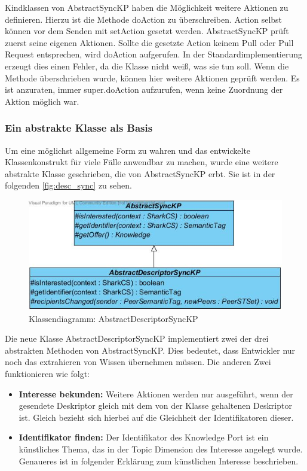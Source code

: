 \documentclass[a4paper]{article}
\begin{document}
	Kindklassen von AbstractSyncKP haben die Möglichkeit weitere Aktionen zu
	definieren. Hierzu ist die Methode doAction zu überschreiben. Action selbst
	können vor dem Senden mit setAction gesetzt werden. AbstractSyncKP prüft
	zuerst seine eigenen Aktionen. Sollte die gesetzte Action keinem Pull
	oder Pull Request entsprechen, wird doAction aufgerufen.
	In der Standardimplementierung
	erzeugt dies einen Fehler, da die Klasse nicht weiß, was sie tun soll.
	Wenn die Methode überschrieben wurde, können hier weitere Aktionen
	geprüft werden. Es ist anzuraten, immer super.doAction aufzurufen, wenn keine 
	Zuordnung der Aktion möglich war.
		
	\subsubsection{Ein abstrakte Klasse als Basis}
	
	Um eine möglichst allgemeine Form zu wahren und das entwickelte Klassenkonstrukt
	für viele Fälle anwendbar zu machen, wurde eine weitere abstrakte Klasse
	geschrieben, die von AbstractSyncKP erbt. Sie ist in der folgenden
	\autoref{fig:desc_sync} zu sehen.
	
	\begin{figure}[H]
		\includegraphics[width=\linewidth]{../Bilder/desc_sync.jpg}
		\caption{Klassendiagramm: AbstractDescriptorSyncKP}
		\label{fig:desc_sync}
	\end{figure}	
	
	Die neue Klasse AbstractDescriptorSyncKP implementiert zwei der drei
	abstrakten Methoden von AbstractSyncKP. Dies bedeutet, dass Entwickler
	nur noch das extrahieren von Wissen übernehmen müssen. Die anderen
	Zwei funktionieren wie folgt:
	
	\begin{itemize}
		\item \textbf{Interesse bekunden:} Weitere Aktionen werden nur ausgeführt,
		wenn der gesendete Deskriptor gleich mit dem von der Klasse gehaltenen
		Deskriptor ist. Gleich bezieht sich hierbei auf die Gleichheit der
		Identifikatoren dieser.
		\item \textbf{Identifikator finden:} Der Identifikator des Knowledge
		Port ist ein künstliches Thema, das in der Topic Dimension des Interesse
		angelegt wurde. Genaueres ist in folgender Erklärung zum 
		künstlichen Interesse beschrieben.
	\end{itemize} 
	
\end{document}
